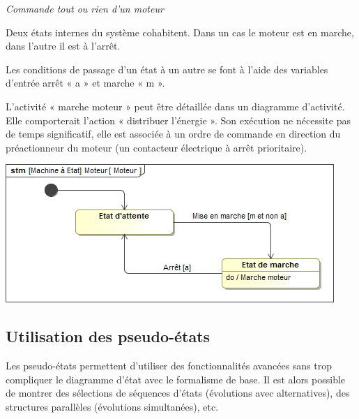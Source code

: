 \documentclass[10pt,fleqn]{article} %
\begin{document}
\begin{exemple}
\textit{Commande tout ou rien d'un moteur}

\begin{minipage}[c]{.48\linewidth}
Deux états internes du système cohabitent. Dans un cas le moteur est en marche, dans l’autre il est à l’arrêt.

Les conditions de passage d’un état à un autre se font à l’aide des variables d’entrée arrêt « a » et marche « m ».


L’activité « marche moteur » peut être détaillée dans un diagramme d’activité. Elle comporterait l’action « distribuer l’énergie ». Son exécution ne nécessite pas de temps significatif, elle est associée à un ordre de commande en direction du préactionneur du moteur (un contacteur électrique à arrêt prioritaire).
\end{minipage} \hfill
\begin{minipage}[c]{.48\linewidth}
\begin{center}
\includegraphics[width=\textwidth]{images/Moteur2}
\end{center}
\end{minipage}


\end{exemple}

\subsection{Utilisation des pseudo-états}


\begin{methode}
Les pseudo-états permettent d’utiliser des fonctionnalités avancées sans trop compliquer le diagramme d’état avec le formalisme de base.
Il est alors possible de montrer des sélections de séquences d’états (évolutions avec alternatives), des structures parallèles (évolutions simultanées), etc.
\end{methode}
\end{document}
